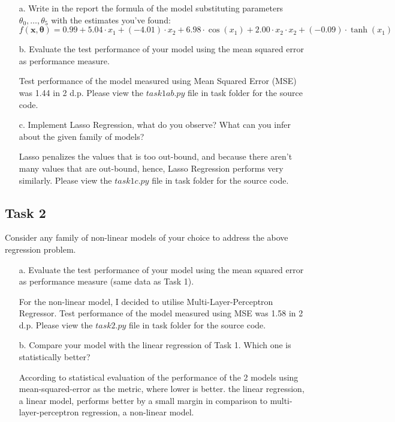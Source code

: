 \documentclass[11pt]{scrartcl}
\begin{document}
\begin{itemize}
	\item [a.] Write in the report the formula of the model substituting parameters $\theta_0, \ldots, \theta_5$ with the estimates you've found:
	$$f(\mathbf{x}, \boldsymbol{\theta}) =  0.99 + 5.04 \cdot x_1 + (-4.01) \cdot x_2 + 6.98 \cdot \cos(x_1) + 2.00 \cdot x_2 \cdot x_2 + (-0.09) \cdot \tanh(x_1)$$

 
    \item [b.] Evaluate the test performance of your model using the mean squared error as performance measure.
    
    Test performance of the model measured using Mean Squared Error (MSE) was 1.44 in 2 d.p. Please view the ${task1ab.py}$ file in task folder for the source code.
    
    \item [c.] Implement Lasso Regression, what do you observe? What can you infer about the given family of models?
    
    Lasso penalizes the values that is too out-bound, and because there aren't many values that are out-bound, hence, Lasso Regression performs very similarly. Please view the ${task1c.py}$ file in task folder for the source code.
\end{itemize}


\subsection*{Task 2}
Consider any family of non-linear models of your choice to address the above regression problem.
\begin{itemize}
	\item [a.] Evaluate the test performance of your model using the mean squared error as performance measure (same data as Task 1). 
	
	For the non-linear model, I decided to utilise Multi-Layer-Perceptron Regressor. Test performance of the model measured using MSE was 1.58 in 2 d.p. Please view the ${task2.py}$ file in task folder for the source code.
	
	\item [b.] Compare your model with the linear regression of Task 1. Which one is {statistically} better?
	
	According to statistical evaluation of the performance of the 2 models using mean-squared-error as the metric, where lower is better. the linear regression, a linear model, performs better by a small margin in comparison to multi-layer-perceptron regression, a non-linear model.
	
\end{itemize}
\end{document}
